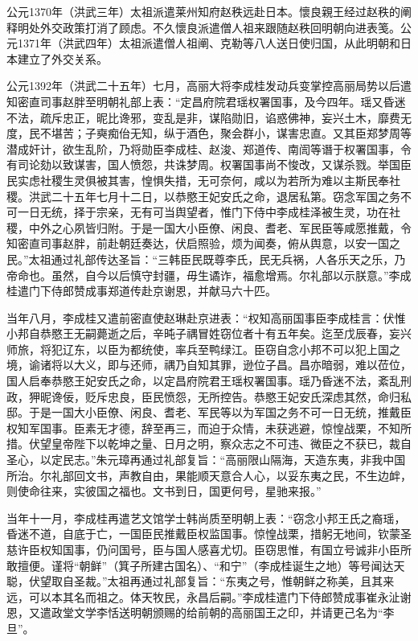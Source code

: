 公元1370年（洪武三年）太祖派遣莱州知府赵秩远赴日本。懷良親王经过赵秩的阐释明处外交政策打消了顾虑。不久懷良派遣僧人祖来跟随赵秩回明朝向进表笺。公元1371年（洪武四年）太祖派遣僧人祖阐、克勒等八人送日使归国，从此明朝和日本建立了外交关系。

公元1392年（洪武二十五年）七月，高丽大将李成桂发动兵变掌控高丽局势以后遣知密直司事赵胖至明朝礼部上表：“定昌府院君瑶权署国事，及今四年。瑶又昏迷不法，疏斥忠正，昵比谗邪，变乱是非，谋陷勋旧，谄惑佛神，妄兴土木，靡费无度，民不堪苦；子奭痴佁无知，纵于酒色，聚会群小，谋害忠直。又其臣郑梦周等潜成奸计，欲生乱阶，乃将勋臣李成桂、赵浚、郑道传、南訚等谮于权署国事，令有司论劾以致谋害，国人愤怨，共诛梦周。权署国事尚不悛改，又谋杀戮。举国臣民实虑社稷生灵俱被其害，惶惧失措，无可奈何，咸以为若所为难以主斯民奉社稷。洪武二十五年七月十二日，以恭愍王妃安氏之命，退居私第。窃念军国之务不可一日无统，择于宗亲，无有可当舆望者，惟门下侍中李成桂泽被生灵，功在社稷，中外之心夙皆归附。于是一国大小臣僚、闲良、耆老、军民臣等咸愿推戴，令知密直司事赵胖，前赴朝廷奏达，伏启照验，烦为闻奏，俯从舆意，以安一国之民。”太祖通过礼部传达圣旨：“三韩臣民既尊李氏，民无兵祸，人各乐天之乐，乃帝命也。虽然，自今以后慎守封疆，毋生谲诈，福愈增焉。尔礼部以示朕意。”李成桂遣门下侍郎赞成事郑道传赴京谢恩，并献马六十匹。

当年八月，李成桂又遣前密直使赵琳赴京进表：“权知高丽国事臣李成桂言：伏惟小邦自恭愍王无嗣薨逝之后，辛旽子禑冒姓窃位者十有五年矣。迄至戊辰春，妄兴师旅，将犯辽东，以臣为都统使，率兵至鸭绿江。臣窃自念小邦不可以犯上国之境，谕诸将以大义，即与还师，禑乃自知其罪，逊位子昌。昌亦暗弱，难以莅位，国人启奉恭愍王妃安氏之命，以定昌府院君王瑶权署国事。瑶乃昏迷不法，紊乱刑政，狎昵谗佞，贬斥忠良，臣民愤怨，无所控告。恭愍王妃安氏深虑其然，命归私邸。于是一国大小臣僚、闲良、耆老、军民等以为军国之务不可一日无统，推戴臣权知军国事。臣素无才德，辞至再三，而迫于众情，未获逃避，惊惶战栗，不知所措。伏望皇帝陛下以乾坤之量、日月之明，察众志之不可违、微臣之不获已，裁自圣心，以定民志。”朱元璋再通过礼部复旨：“高丽限山隔海，天造东夷，非我中国所治。尔礼部回文书，声教自由，果能顺天意合人心，以妥东夷之民，不生边衅，则使命往来，实彼国之福也。文书到日，国更何号，星驰来报。”

当年十一月，李成桂再遣艺文馆学士韩尚质至明朝上表：“窃念小邦王氏之裔瑶，昏迷不道，自底于亡，一国臣民推戴臣权监国事。惊惶战栗，措躬无地间，钦蒙圣慈许臣权知国事，仍问国号，臣与国人感喜尤切。臣窃思惟，有国立号诚非小臣所敢擅便。谨将“朝鲜”（箕子所建古国名）、“和宁”（李成桂诞生之地）等号闻达天聪，伏望取自圣裁。”太祖再通过礼部复旨：“东夷之号，惟朝鲜之称美，且其来远，可以本其名而祖之。体天牧民，永昌后嗣。”李成桂遣门下侍郎赞成事崔永沚谢恩，又遣政堂文学李恬送明朝颁赐的给前朝的高丽国王之印，并请更己名为“李旦”。

